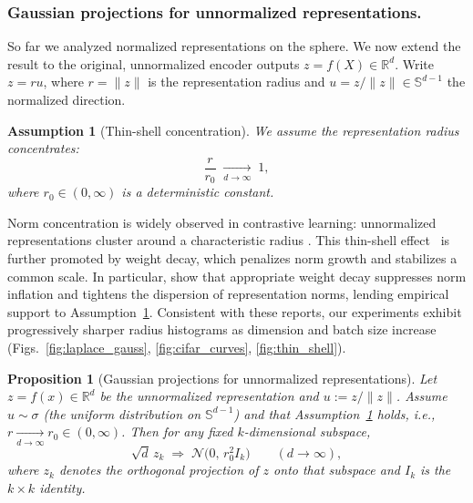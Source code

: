 \documentclass{article}
\newtheorem{assumption}{Assumption}
\newtheorem{proposition}{Proposition}
\newcommand{\R}{\mathbb{R}}
\newcommand{\Sph}{\mathbb{S}}
\begin{document}
\subsubsection{Gaussian projections for unnormalized representations.}
So far we analyzed normalized representations on the sphere. We now extend the result to the original, unnormalized encoder outputs $z=f(X)\in\R^d$.  
Write $z = r u$, where $r=\|z\|$ is the representation radius and $u=z/\|z\|\in\Sph^{d-1}$ the normalized direction.

\begin{assumption}[Thin-shell concentration]
\label{assump:thin-shell}
We assume the representation radius concentrates:
\begin{equation}
\label{eq:thin-shell}
\frac{r}{r_0} \;\xrightarrow[d\to\infty]{}\; 1,
\end{equation}
where $r_0\in(0,\infty)$ is a deterministic constant.
\end{assumption}

Norm concentration is widely observed in contrastive learning: unnormalized representations cluster around a characteristic radius \citep{wang2020understanding,haochen2021provable,levi2024double}. This thin-shell effect~\citep{klartag2023logarithmic} is further promoted by weight decay, which penalizes norm growth and stabilizes a common scale. In particular, \citet{draganov2025importance} show that appropriate weight decay suppresses norm inflation and tightens the dispersion of representation norms, lending empirical support to Assumption~\ref{assump:thin-shell}. Consistent with these reports, our experiments exhibit progressively sharper radius histograms as dimension and batch size increase (Figs.~\ref{fig:laplace_gauss}, \ref{fig:cifar_curves}, \ref{fig:thin_shell}).

\begin{proposition}[Gaussian projections for unnormalized representations]
\label{prop:unnorm-unif}
Let $z=f(x)\in\R^d$ be the unnormalized representation and $u:=z/\|z\|$. 
Assume $u\sim\sigma$ (the uniform distribution on $\Sph^{d-1}$) and that Assumption~\ref{assump:thin-shell} holds, i.e., $r\xrightarrow[d\to\infty]{} r_0\in(0,\infty)$. 
Then for any fixed $k$-dimensional subspace,
\begin{equation}
\label{eq:gauss-unnorm-unif}
\sqrt{d}\,z_k \;\Rightarrow\; \mathcal N\!\big(0,\,r_0^2 I_k\big)
\qquad (d\to\infty),
\end{equation}
where $z_k$ denotes the orthogonal projection of $z$ onto that subspace and $I_k$ is the $k\times k$ identity.
\end{proposition}
\end{document}
